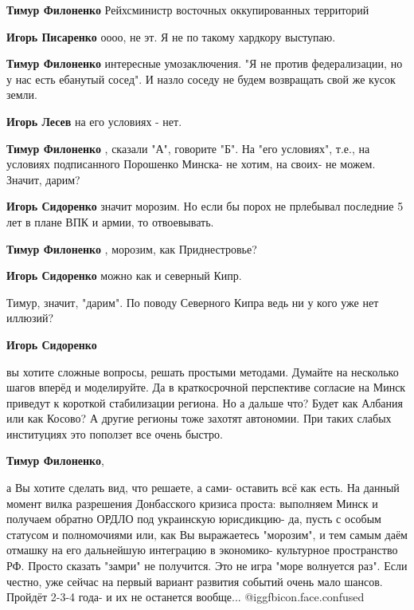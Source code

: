 \begin{itemize}
\begin{itemize}
\textbf{Тимур Филоненко} Рейхсминистр восточных оккупированных территорий

\textbf{Игорь Писаренко} оооо, не эт. Я не по такому хардкору выступаю.

\textbf{Тимур Филоненко} интересные умозаключения. "Я не против федерализации, но у нас есть ебанутый сосед". И назло соседу не будем возвращать свой же кусок земли.

\textbf{Игорь Лесев} на его условиях - нет.

\textbf{Тимур Филоненко} , сказали "А", говорите "Б". На "его условиях", т.е.,
на условиях подписанного Порошенко Минска- не хотим, на своих- не можем.
Значит, дарим?

\textbf{Игорь Сидоренко} значит морозим. Но если бы порох не прлебывал последние 5 лет в плане ВПК и армии, то отвоевывать.

\textbf{Тимур Филоненко} , морозим, как Приднестровье?

\textbf{Игорь Сидоренко} можно как и северный Кипр.

Тимур, значит, "дарим". По поводу Северного Кипра ведь ни у кого уже нет иллюзий?

\textbf{Игорь Сидоренко} 

вы хотите сложные вопросы, решать простыми методами. Думайте на несколько шагов
вперёд и моделируйте. Да в краткосрочной перспективе согласие на Минск приведут
к короткой стабилизации региона. Но а дальше что? Будет как Албания или как
Косово? А другие регионы тоже захотят автономии. При таких слабых институциях
это поползет все очень быстро.


\textbf{Тимур Филоненко}, 

а Вы хотите сделать вид, что решаете, а сами- оставить всё как есть. На данный
момент вилка разрешения Донбасского кризиса проста: выполняем Минск и получаем
обратно ОРДЛО под украинскую юрисдикцию- да, пусть с особым статусом и
полномочиями или, как Вы выражаетесь "морозим", и тем самым даём отмашку на его
дальнейшую интеграцию в экономико- культурное пространство РФ. Просто сказать
"замри" не получится. Это не игра "море волнуется раз". Если честно, уже сейчас
на первый вариант развития событий очень мало шансов. Пройдёт 2-3-4 года- и их
не останется вообще... @igg{fbicon.face.confused} 


\end{itemize}
\end{itemize}
